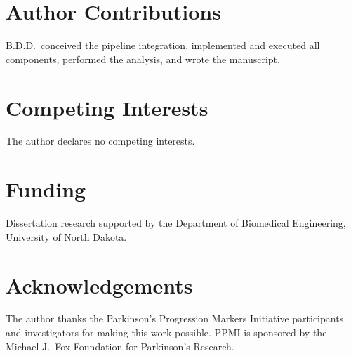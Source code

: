 \documentclass[11pt,letterpaper]{article}
\begin{document}
\section*{Author Contributions}
B.D.D.\ conceived the pipeline integration, implemented and executed all components, performed the analysis, and wrote the manuscript.

\section*{Competing Interests}
The author declares no competing interests.

\section*{Funding}
Dissertation research supported by the Department of Biomedical Engineering, University of North Dakota.

\section*{Acknowledgements}
The author thanks the Parkinson's Progression Markers Initiative participants and investigators for making this work possible. PPMI is sponsored by the Michael J.\ Fox Foundation for Parkinson's Research.
\end{document}
